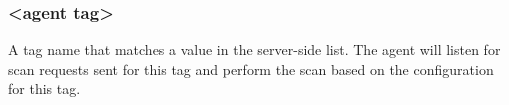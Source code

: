 \subsubsection{<agent tag>}\label{sec:agent-tag}
A tag name that matches a value in the server-side 
list.  The agent will listen for scan requests sent for this tag and perform the \scaresolver scan
based on the configuration for this tag.
